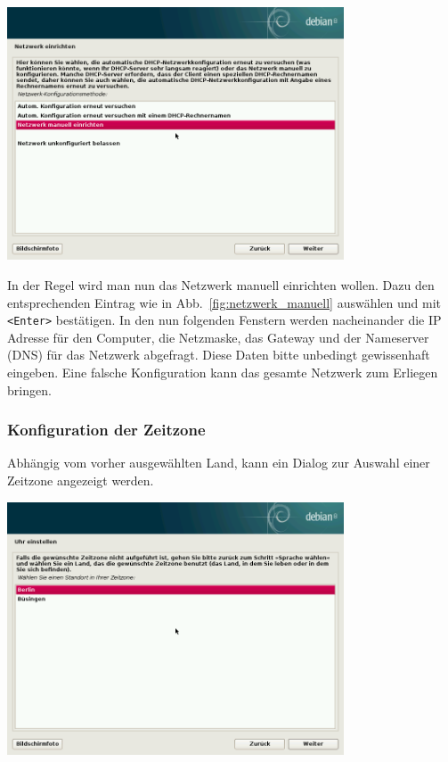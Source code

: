 \documentclass[a4paper,12pt,twoside]{article}
\begin{document}
\begin{minipage}{\textwidth}
    \centering
    \includegraphics[width=10cm]{screenshots/select_network_manually.png}
    \label{fig:netzwerk_manuell}
\end{minipage}
\bigskip

In der Regel wird man nun das Netzwerk manuell einrichten wollen. Dazu
den entsprechenden Eintrag wie in Abb.~\ref{fig:netzwerk_manuell} auswählen und
mit \texttt{{\textless}Enter{\textgreater}} bestätigen. In den nun folgenden
Fenstern werden nacheinander die IP Adresse für den Computer, die
Netzmaske, das Gateway und der Nameserver (DNS) für das Netzwerk
abgefragt. Diese Daten bitte unbedingt gewissenhaft eingeben. Eine
falsche Konfiguration kann das gesamte Netzwerk zum Erliegen bringen.


\subsubsection{Konfiguration der Zeitzone}
\label{sct:inst_timezone}

Abhängig vom vorher ausgewählten Land, kann ein Dialog zur Auswahl einer
Zeitzone angezeigt werden.

\bigskip
\begin{minipage}{\linewidth}
    \centering
    \includegraphics[width=10cm]{screenshots/select_timezone.png}
    \label{fig:inst_timezone}
\end{minipage}
\end{document}
